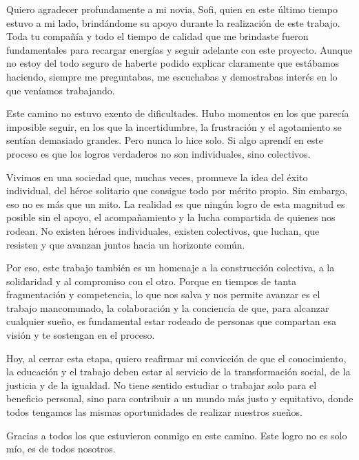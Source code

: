 \begin{acknowledgements}
Quiero agradecer profundamente a mi novia, Sofi, quien en este último tiempo estuvo a mi lado, brindándome su apoyo durante la realización de este trabajo. Toda tu compañía y todo el tiempo de calidad que me brindaste fueron fundamentales para recargar energías y seguir adelante con este proyecto. Aunque no estoy del todo seguro de haberte podido explicar claramente que estábamos haciendo, siempre me preguntabas, me escuchabas y demostrabas interés en lo que veníamos trabajando.

Este camino no estuvo exento de dificultades. Hubo momentos en los que parecía imposible seguir, en los que la incertidumbre, la frustración y el agotamiento se sentían demasiado grandes. Pero nunca lo hice solo. Si algo aprendí en este proceso es que los logros verdaderos no son individuales, sino colectivos.

Vivimos en una sociedad que, muchas veces, promueve la idea del éxito individual, del héroe solitario que consigue todo por mérito propio. Sin embargo, eso no es más que un mito. La realidad es que ningún logro de esta magnitud es posible sin el apoyo, el acompañamiento y la lucha compartida de quienes nos rodean. No existen héroes individuales, existen colectivos, que luchan, que resisten y que avanzan juntos hacia un horizonte común.

Por eso, este trabajo también es un homenaje a la construcción colectiva, a la solidaridad y al compromiso con el otro. Porque en tiempos de tanta fragmentación y competencia, lo que nos salva y nos permite avanzar es el trabajo mancomunado, la colaboración y la conciencia de que, para alcanzar cualquier sueño, es fundamental estar rodeado de personas que compartan esa visión y te sostengan en el proceso.

Hoy, al cerrar esta etapa, quiero reafirmar mi convicción de que el conocimiento, la educación y el trabajo deben estar al servicio de la transformación social, de la justicia y de la igualdad. No tiene sentido estudiar o trabajar solo para el beneficio personal, sino para contribuir a un mundo más justo y equitativo, donde todos tengamos las mismas oportunidades de realizar nuestros sueños.

Gracias a todos los que estuvieron conmigo en este camino. Este logro no es solo mío, es de todos nosotros.




 

\end{acknowledgements}